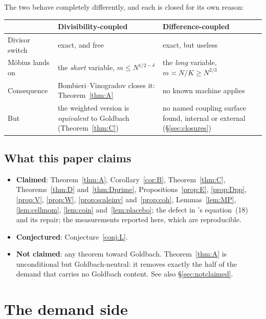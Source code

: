 \documentclass[11pt,a4paper]{article}
\theoremstyle{plain}
\theoremstyle{definition}
\begin{document}
\noindent
The two behave completely differently, and each is closed for its own
reason:

\begin{center}
\begin{tabular}{p{}p{}p{}}
\hline
 & \textbf{Divisibility-coupled} & \textbf{Difference-coupled}\\
\hline
Divisor switch & exact, and free & exact, but useless\\
M\"obius lands on & the \emph{short} variable, $m\le N^{1/2-\delta}$ &
 the \emph{long} variable, $m \asymp N/K \ge N^{2/3}$\\
Consequence & Bombieri--Vinogradov closes it: Theorem~\ref{thm:A} &
 no known machine applies\\
But & the weighted version is \emph{equivalent} to Goldbach
 (Theorem~\ref{thm:C}) & no named coupling surface found, internal or
 external (\S\ref{sec:closures})\\
\hline
\end{tabular}
\end{center}

\subsection{What this paper claims}\label{sec:claims}

\begin{itemize}
\item \textbf{Claimed}: Theorem~\ref{thm:A}, Corollary~\ref{cor:B},
  Theorem~\ref{thm:C}, Theorems~\ref{thm:D} and~\ref{thm:Dprime},
  Propositions~\ref{prop:E}, \ref{prop:Dpp}, \ref{prop:V},
  \ref{prop:W}, \ref{prop:scaleinv} and~\ref{prop:coh},
  Lemmas~\ref{lem:MP}, \ref{lem:cellmom}, \ref{lem:coin}
  and~\ref{lem:placebo}; the defect in \cite{HL}'s equation~(18) and
  its repair; the measurements reported here, which are reproducible.
\item \textbf{Conjectured}: Conjecture~\ref{conj:L}.
\item \textbf{Not claimed}: any theorem toward Goldbach.
  Theorem~\ref{thm:A} is unconditional but Goldbach-neutral: it
  removes exactly the half of the demand that carries no Goldbach
  content. See also \S\ref{sec:notclaimed}.
\end{itemize}

\section{The demand side}\label{sec:demand}
\end{document}
